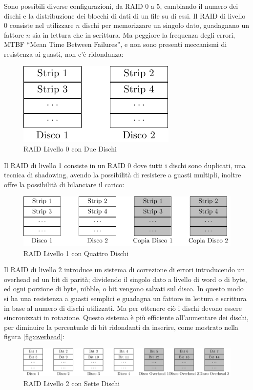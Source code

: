\documentclass{article}
\numberwithin{equation}{subsection}
\begin{document}
Sono possibili diverse configurazioni, da RAID 0 a 5, cambiando il numero dei dischi e la distribuzione dei blocchi di dati di un file su di essi. Il RAID di livello 0 consiste nel utilizzare $n$ dischi 
per memorizzare un singolo dato, guadagnano un fattore $n$ sia in lettura che in scrittura. Ma peggiore la frequenza degli errori, MTBF ``Mean Time Between Failures'', e non sono presenti meccanismi di 
resistenza ai guasti, non c'è ridondanza: 
\begin{figure}[H]%
    \centering%
    \includegraphics{raid-0.pdf}%
    \caption{RAID Livello 0 con Due Dischi}%
\end{figure}
Il RAID di livello 1 consiste in un RAID 0 dove tutti i dischi sono duplicati, una tecnica di shadowing, avendo la possibilità di resistere a guasti multipli, inoltre offre la possibilità di bilanciare il carico: 
\begin{figure}[H]%
    \centering%
    \includegraphics{raid-1.pdf}%
    \caption{RAID Livello 1 con Quattro Dischi}%
\end{figure}
Il RAID di livello 2 introduce un sistema di correzione di errori introducendo un overhead ed un bit di parità; dividendo il singolo dato a livello di word o di byte, ed ogni porzione di byte, nibble, o bit vengono salvati sul disco. In questo modo si ha 
una resistenza a guasti semplici e guadagna un fattore in lettura e scrittura in base al numero di dischi utilizzati. Ma per ottenere ciò i dischi devono essere sincronizzati in rotazione. Questo sistema è più efficiente all'aumentare dei 
dischi, per diminuire la percentuale di bit ridondanti da inserire, come mostrato nella figura \ref{fig:overhead}:
\begin{figure}[H]%
    \centering%
    \includegraphics[scale=.8]{raid-2.pdf}%
    \caption{RAID Livello 2 con Sette Dischi}%
\end{figure}
\end{document}

